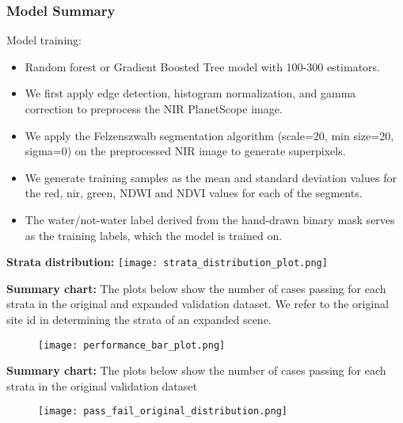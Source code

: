 \documentclass[8pt]{beamer}
\begin{document}
\begin{frame}
  \frametitle{Model Summary}
  \vfill
  Model training:
  \begin{itemize}
    \item Random forest or Gradient Boosted Tree model with 100-300 estimators. \\
    \item We first apply edge detection, histogram normalization, and gamma correction to preprocess the NIR PlanetScope image. \\
    \item We apply the Felzenszwalb segmentation algorithm (scale=20, min size=20, sigma=0) on the preprocessed NIR image to generate superpixels. \\
    \item We generate training samples as the mean and standard deviation values for the red, nir, green, NDWI and NDVI values for each of the segments. \\
    \item The water/not-water label derived from the hand-drawn binary mask serves as the training labels, which the model is trained on.

  \end{itemize}
  \vfill
  \end{frame}
\begin{frame}
\textbf{Strata distribution:}
\vfill
\centering
\texttt{[image: strata\_distribution\_plot.png]}
\end{frame}

\begin{frame}
\textbf{Summary chart:}
The plots below show the number of cases passing for each strata in the original and expanded validation dataset. We refer to the original site id in determining the strata of an expanded scene.
\vfill
\begin{figure}
  \hspace*{-1cm}   
\texttt{[image: performance\_bar\_plot.png]}
\end{figure}
\end{frame}

\begin{frame}
  \textbf{Summary chart:}
  The plots below show the number of cases passing for each strata in the original validation dataset
  \begin{figure}
    \hspace*{-1cm}   
  \texttt{[image: pass\_fail\_original\_distribution.png]}
  \end{figure}
\end{frame}
\end{document}
